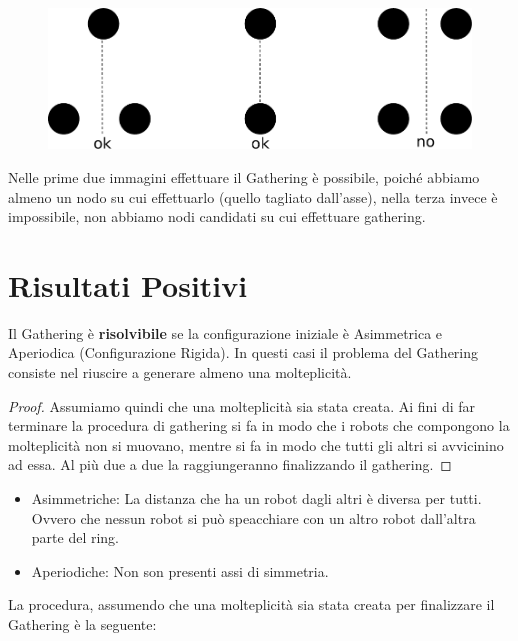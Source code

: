 \begin{figure}[H]
    \centering
    \includegraphics[scale=0.7]{images/n_48}
\end{figure}

Nelle prime due immagini effettuare il Gathering è possibile, poiché abbiamo
almeno un nodo su cui effettuarlo (quello tagliato dall'asse), nella terza
invece è impossibile, non abbiamo nodi candidati su cui effettuare gathering.

\section{Risultati Positivi}
\begin{theorem}
    Il Gathering è \textbf{risolvibile} se la configurazione iniziale è
    Asimmetrica e Aperiodica (Configurazione Rigida). In questi casi il problema del
    Gathering consiste nel riuscire a generare almeno una molteplicità.
\end{theorem}

\begin{proof}
    Assumiamo quindi che una molteplicità sia stata creata. Ai fini di far
    terminare la procedura di gathering si fa in modo che i robots che compongono
    la molteplicità non si muovano, mentre si fa in modo che tutti gli altri si
    avvicinino ad essa. Al più due a due la raggiungeranno finalizzando il
    gathering.
\end{proof}

\begin{itemize}
    \item Asimmetriche: La distanza che ha un robot dagli altri è diversa per
          tutti. Ovvero che nessun robot si può speacchiare con un altro robot
          dall'altra parte del ring.
    \item Aperiodiche: Non son presenti assi di simmetria.
\end{itemize}

La procedura, assumendo che una molteplicità sia stata creata per finalizzare il
Gathering è la seguente:

